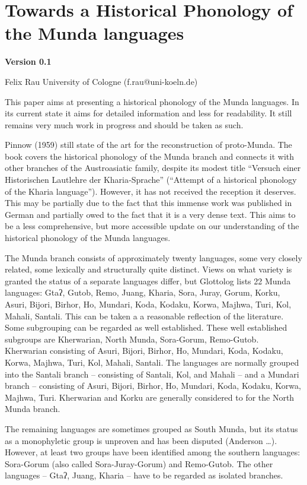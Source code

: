 \documentclass[a4paper,]{article}
\date{}
\begin{document}
\section{Towards a Historical Phonology of the Munda
languages}\label{towards-a-historical-phonology-of-the-munda-languages}

\textbf{Version 0.1}

Felix Rau University of Cologne (f.rau@uni-koeln.de)

This paper aims at presenting a historical phonology of the Munda
languages. In its current state it aims for detailed information and
less for readability. It still remains very much work in progress and
should be taken as such.

Pinnow (1959) still state of the art for the reconstruction of
proto-Munda. The book covers the historical phonology of the Munda
branch and connects it with other branches of the Austroasiatic family,
despite its modest title ``Versuch einer Historischen Lautlehre der
Kharia‐Sprache'' (``Attempt of a historical phonology of the Kharia
language''). However, it has not received the reception it deserves.
This may be partially due to the fact that this immense work was
published in German and partially owed to the fact that it is a very
dense text. This aims to be a less comprehensive, but more accessible
update on our understanding of the historical phonology of the Munda
languages.

The Munda branch consists of approximately twenty languages, some very
closely related, some lexically and structurally quite distinct. Views
on what variety is granted the status of a separate languages differ,
but Glottolog lists 22 Munda languages: Gtaʔ, Gutob, Remo, Juang,
Kharia, Sora, Juray, Gorum, Korku, Asuri, Bijori, Birhor, Ho, Mundari,
Koda, Kodaku, Korwa, Majhwa, Turi, Kol, Mahali, Santali. This can be
taken a a reasonable reflection of the literature. Some subgrouping can
be regarded as well established. These well established subgroups are
Kherwarian, North Munda, Sora-Gorum, Remo-Gutob. Kherwarian consisting
of Asuri, Bijori, Birhor, Ho, Mundari, Koda, Kodaku, Korwa, Majhwa,
Turi, Kol, Mahali, Santali. The languages are normally grouped into the
Santali branch -- consisting of Santali, Kol, and Mahali -- and a
Mundari branch -- consisting of Asuri, Bijori, Birhor, Ho, Mundari,
Koda, Kodaku, Korwa, Majhwa, Turi. Kherwarian and Korku are generally
considered to for the North Munda branch.

The remaining languages are sometimes grouped as South Munda, but its
status as a monophyletic group is unproven and has been disputed
(Anderson \ldots{}). However, at least two groups have been identified
among the southern languages: Sora-Gorum (also called Sora-Juray-Gorum)
and Remo-Gutob. The other languages -- Gtaʔ, Juang, Kharia -- have to be
regarded as isolated branches.
\end{document}
